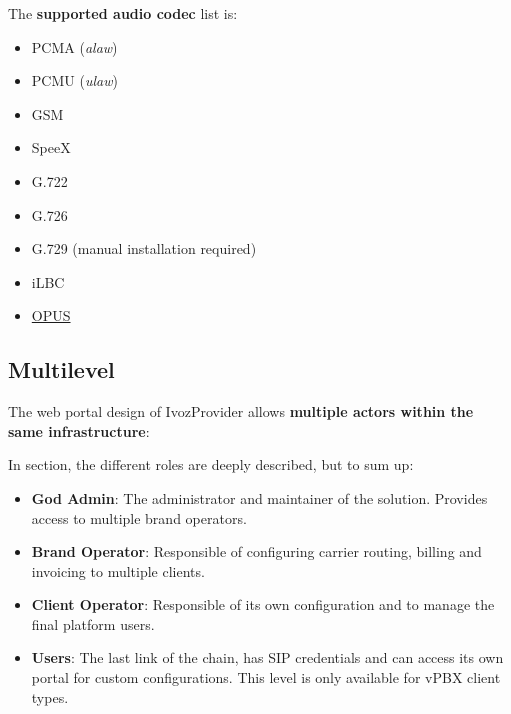 \documentclass[letterpaper,10pt,spanish]{sphinxmanual}
\begin{document}
The \textbf{supported audio codec} list is:
\begin{itemize}
\item {} 
PCMA (\emph{alaw})

\item {} 
PCMU (\emph{ulaw})

\item {} 
GSM

\item {} 
SpeeX

\item {} 
G.722

\item {} 
G.726

\item {} 
G.729 (manual installation required)

\item {} 
iLBC

\item {} 
\href{http://opus-codec.org/}{OPUS}

\end{itemize}


\subsection{Multilevel}
\label{basic_concepts/intro/what_is_ivozprovider:multilevel}
The web portal design of IvozProvider allows \textbf{multiple actors within the
same infrastructure}:

\noindent{}

In {\hyperref[basic_concepts/operation_roles/index:operation\string-roles]{}} section, the different roles are deeply
described, but to sum up:
\begin{itemize}
\item {} 
\textbf{God Admin}: The administrator and maintainer of the solution. Provides
access to multiple brand operators.

\item {} 
\textbf{Brand Operator}: Responsible of configuring carrier routing, billing and invoicing to
multiple clients.

\item {} 
\textbf{Client Operator}: Responsible of its own configuration and to manage the final platform users.

\item {} 
\textbf{Users}: The last link of the chain, has SIP credentials and can access
its own portal for custom configurations. This level is only available for vPBX client types.

\end{itemize}
\end{document}
